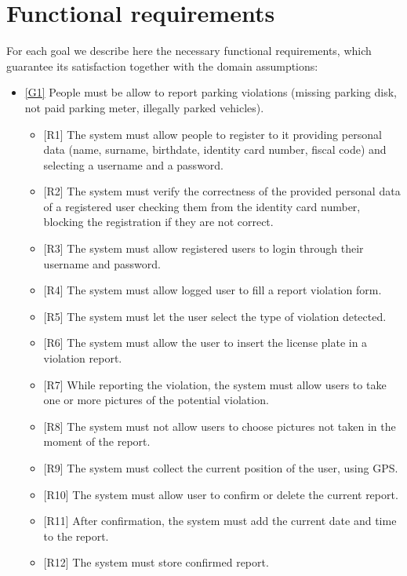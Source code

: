\documentclass[a4paper]{report}
\begin{document}
\section{Functional requirements}
\label{sec:fun-requirements} 
For each goal we describe here the necessary functional requirements, which guarantee its satisfaction together with the domain assumptions:
\begin{itemize}
\item \hyperref[G1]{[G1]} People must be allow to report parking violations (missing parking disk, not paid parking meter, illegally parked vehicles).
\begin{itemize}
\item {[R1]}	\label{R1}The system must allow people to register to it providing personal data (name, surname, birthdate, identity card number, fiscal code) and selecting a username and a password.
\item {[R2]}	\label{R2}The system must verify the correctness of the provided personal data of a registered user checking them from the identity card number, blocking the registration if they are not correct.
\item {[R3]}	\label{R3}The system must allow registered users to login through their username and password.
\item {[R4]}	\label{R4}The system must allow logged user to fill a report violation form.
\item {[R5]}	\label{R5}The system must let the user select the type of violation detected.
\item {[R6]}	\label{R6}The system must allow the user to insert the license plate in a violation report.
\item {[R7]}	\label{R7}While reporting the violation, the system must allow users to take one or more pictures of the potential violation.
\item {[R8]}	\label{R8}The system must not allow users to choose pictures not taken in the moment of the report.
\item {[R9]}	\label{R9}The system must collect the current position of the user, using GPS.
\item {[R10]}	\label{R10}The system must allow user to confirm or delete the current report.
\item {[R11]}	\label{R11}After confirmation, the system must add the current date and time to the report.
\item {[R12]}	\label{R12}The system must store confirmed report.
\end{itemize}

\end{itemize}
\end{document}
